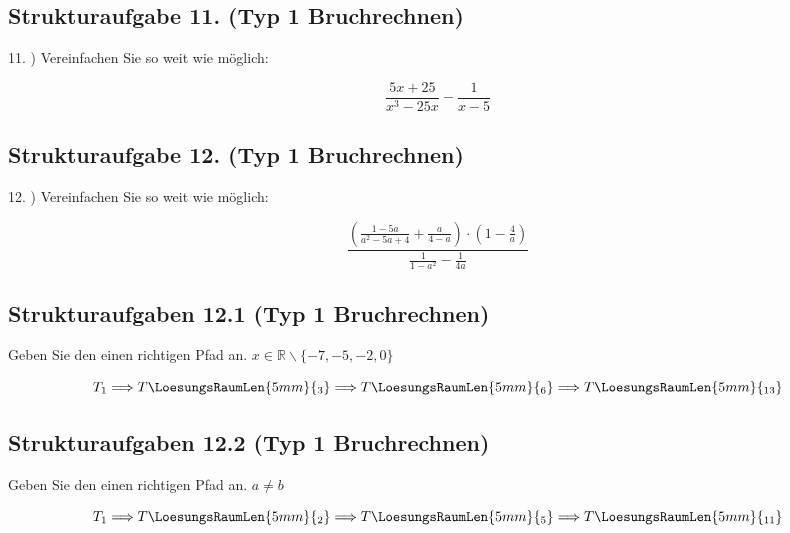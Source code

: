 
\subsection*{Strukturaufgabe 11. (Typ 1 Bruchrechnen)}

11. ) Vereinfachen Sie so weit wie möglich:

$$\frac{5x+25}{x^3-25x} - \frac1{x-5}$$


\subsection*{Strukturaufgabe 12. (Typ 1 Bruchrechnen)}

12. ) Vereinfachen Sie so weit wie möglich:

$$\frac{\left( \frac{1-5a}{a^2-5a+4} + \frac{a}{4-a} \right)  \cdot{} \left( 1-\frac4a \right)}{\frac1{1-a^2} - \frac1{4a}}$$


\newpage
\subsection*{Strukturaufgaben 12.1 (Typ 1 Bruchrechnen)}


Geben Sie den einen richtigen Pfad
an. $x \in \mathbb{R}\backslash \{ -7, -5, -2, 0\}$


$$T_1 \Longrightarrow T\LoesungsRaumLen{5mm}{{}_3} \Longrightarrow
T\LoesungsRaumLen{5mm}{{}_6} \Longrightarrow T\LoesungsRaumLen{5mm}{{}_{13}}$$
\newpage
\subsection*{Strukturaufgaben 12.2 (Typ 1 Bruchrechnen)}


Geben Sie den einen richtigen Pfad
an. $a \ne b$


$$T_1 \Longrightarrow T\LoesungsRaumLen{5mm}{{}_2} \Longrightarrow
T\LoesungsRaumLen{5mm}{{}_5} \Longrightarrow T\LoesungsRaumLen{5mm}{{}_{11}}$$



